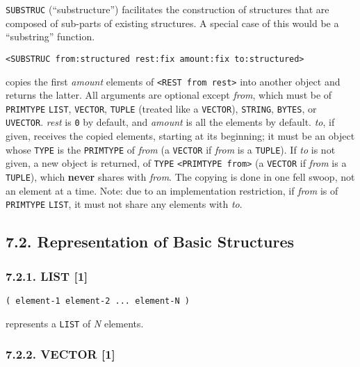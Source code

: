 \documentclass[a4paper,]{article}
\begin{document}
 \texttt{SUBSTRUC} (``substructure'') facilitates the construction of structures that are
composed of sub-parts of existing structures. A special case of this would be a ``substring'' function.

\begin{verbatim}
<SUBSTRUC from:structured rest:fix amount:fix to:structured>
\end{verbatim}

copies the first \emph{amount} elements of \texttt{\textless{}REST\ from\ rest\textgreater{}} into another object and
returns the latter. All arguments are optional except \emph{from}, which must be of \texttt{PRIMTYPE} \texttt{LIST},
\texttt{VECTOR}, \texttt{TUPLE} (treated like a \texttt{VECTOR}), \texttt{STRING}, \texttt{BYTES}, or \texttt{UVECTOR}.
\emph{rest} is \texttt{0} by default, and \emph{amount} is all the elements by default. \emph{to}, if given, receives the
copied elements, starting at its beginning; it must be an object whose \texttt{TYPE} is the \texttt{PRIMTYPE} of
\emph{from} (a \texttt{VECTOR} if \emph{from} is a \texttt{TUPLE}). If \emph{to} is not given, a new object is returned, of
\texttt{TYPE} \texttt{\textless{}PRIMTYPE\ from\textgreater{}} (a \texttt{VECTOR} if \emph{from} is a \texttt{TUPLE}),
which \textbf{never} shares with \emph{from}. The copying is done in one fell swoop, not an element at a time. Note: due to
an implementation restriction, if \emph{from} is of \texttt{PRIMTYPE} \texttt{LIST}, it must not share any elements with
\emph{to}.

\subsection{7.2. Representation of Basic Structures}\label{representation-of-basic-structures}

\subsubsection{7.2.1. LIST {[}1{]}}\label{list-1}

\begin{verbatim}
( element-1 element-2 ... element-N )
\end{verbatim}

  represents a \texttt{LIST} of \emph{N}
elements.

\subsubsection{7.2.2. VECTOR {[}1{]}}\label{vector-1}
\end{document}
